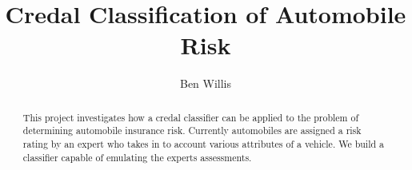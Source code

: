 \documentclass[11pt]{report}
\begin{document}
\title{Credal Classification of Automobile Risk}
\author{Ben Willis}
\maketitle

\begin{abstract}
	This project investigates how a credal classifier can be applied to the problem of determining automobile insurance risk. Currently automobiles are assigned a risk rating by an expert who takes in to account various attributes of a vehicle. We build a classifier capable of emulating the experts assessments.
\end{abstract}

\tableofcontents








\end{document}
